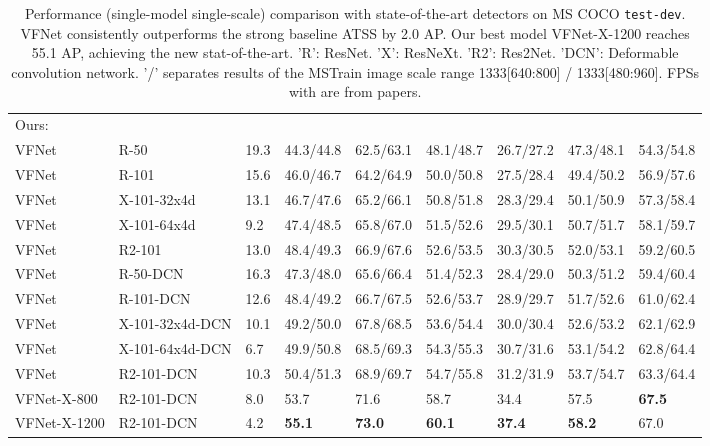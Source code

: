 \begin{table*}[tpb]
\begin{center}
\begin{tabular}{ K{11.0em} | K{8.0em} |K{2.5em} | K{4.2em} K{4.2em} K{4.2em} | K{4.2em} K{4.2em} K{4.2em} }
            \hline
             Ours: &  &    &  &  &  &  &\\
             VFNet & R-50 & 19.3 & 44.3/44.8 & 62.5/63.1 & 48.1/48.7 & 26.7/27.2 & 47.3/48.1 & 54.3/54.8 \\
             VFNet & R-101 & 15.6 & 46.0/46.7 & 64.2/64.9 & 50.0/50.8 & 27.5/28.4 & 49.4/50.2 & 56.9/57.6 \\
             VFNet & X-101-32x4d & 13.1 & 46.7/47.6 & 65.2/66.1 & 50.8/51.8 & 28.3/29.4 & 50.1/50.9 & 57.3/58.4 \\
             VFNet & X-101-64x4d & 9.2 & 47.4/48.5 & 65.8/67.0 & 51.5/52.6 & 29.5/30.1 & 50.7/51.7 & 58.1/59.7 \\
             VFNet & R2-101~\cite{Res2Net} & 13.0 & 48.4/49.3 & 66.9/67.6 & 52.6/53.5 & 30.3/30.5 & 52.0/53.1 & 59.2/60.5 \\
             VFNet & R-50-DCN & 16.3 & 47.3/48.0 & 65.6/66.4 & 51.4/52.3 & 28.4/29.0 & 50.3/51.2 & 59.4/60.4 \\
             VFNet & R-101-DCN & 12.6 & 48.4/49.2 & 66.7/67.5 & 52.6/53.7 & 28.9/29.7 & 51.7/52.6 & 61.0/62.4 \\
             VFNet & X-101-32x4d-DCN & 10.1 & 49.2/50.0 & 67.8/68.5 & 53.6/54.4 & 30.0/30.4 & 52.6/53.2 & 62.1/62.9 \\
             VFNet & X-101-64x4d-DCN & 6.7 & 49.9/50.8 & 68.5/69.3 & 54.3/55.3 & 30.7/31.6 & 53.1/54.2 & 62.8/64.4 \\
             VFNet & R2-101-DCN~\cite{Res2Net} & 10.3 & 50.4/51.3 & 68.9/69.7 & 54.7/55.8 & 31.2/31.9 & 53.7/54.7 & 63.3/64.4 \\
             
             VFNet-X-800 & R2-101-DCN~\cite{Res2Net} & 8.0 & 53.7 & 71.6 & 58.7 & 34.4 & 57.5 & \textbf{67.5} \\
             VFNet-X-1200 & R2-101-DCN~\cite{Res2Net} & 4.2 & \textbf{55.1} & \textbf{73.0} & \textbf{60.1} & \textbf{37.4} & \textbf{58.2} & 67.0 \\
            
            \hline
        \end{tabular}
    \end{center}
    \vspace{-5mm}
\caption{Performance (single-model single-scale) comparison with state-of-the-art detectors on MS COCO \texttt{test-dev}. VFNet consistently outperforms the strong baseline ATSS by 2.0 AP. Our best model VFNet-X-1200 reaches 55.1 AP, achieving the new stat-of-the-art. 'R': ResNet. 'X': ResNeXt. 'R2': Res2Net. 'DCN': Deformable convolution network. '/' separates results of the MSTrain image scale range 1333[640:800] / 1333[480:960]. FPSs with  are from papers.}
\label{table:sota}
\end{table*}
